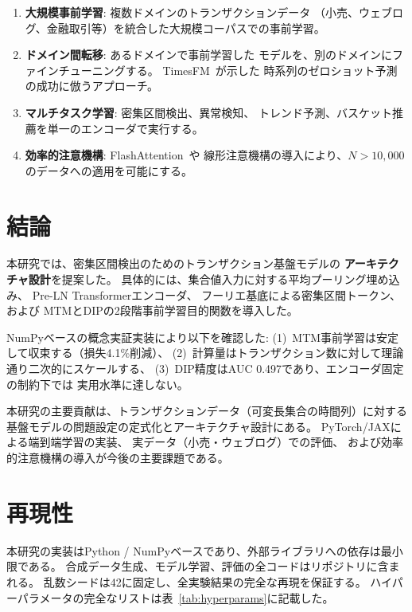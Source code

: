 \documentclass[sigconf,nonacm]{acmart}
\begin{document}
\begin{enumerate}
    \item \textbf{大規模事前学習}: 複数ドメインのトランザクションデータ
    （小売、ウェブログ、金融取引等）を統合した大規模コーパスでの事前学習。

    \item \textbf{ドメイン間転移}: あるドメインで事前学習した
    モデルを、別のドメインにファインチューニングする。
    TimesFM~\cite{das2024timesfm}が示した
    時系列のゼロショット予測の成功に倣うアプローチ。

    \item \textbf{マルチタスク学習}: 密集区間検出、異常検知、
    トレンド予測、バスケット推薦を単一のエンコーダで実行する。

    \item \textbf{効率的注意機構}: FlashAttention~\cite{dao2022flashattention}や
    線形注意機構の導入により、$N > 10{,}000$のデータへの適用を可能にする。
\end{enumerate}

\section{結論}
\label{sec:conclusion}

本研究では、密集区間検出のためのトランザクション基盤モデルの
\textbf{アーキテクチャ設計}を提案した。
具体的には、集合値入力に対する平均プーリング埋め込み、
Pre-LN Transformerエンコーダ、
フーリエ基底による密集区間トークン、および
MTMとDIPの2段階事前学習目的関数を導入した。

NumPyベースの概念実証実装により以下を確認した:
(1)~MTM事前学習は安定して収束する（損失4.1\%削減）、
(2)~計算量はトランザクション数に対して理論通り二次的にスケールする、
(3)~DIP精度はAUC 0.497であり、エンコーダ固定の制約下では
実用水準に達しない。

本研究の主要貢献は、トランザクションデータ（可変長集合の時間列）に対する
基盤モデルの問題設定の定式化とアーキテクチャ設計にある。
PyTorch/JAXによる端到端学習の実装、
実データ（小売・ウェブログ）での評価、
および効率的注意機構の導入が今後の主要課題である。

\section*{再現性}

本研究の実装はPython / NumPyベースであり、外部ライブラリへの依存は最小限である。
合成データ生成、モデル学習、評価の全コードはリポジトリに含まれる。
乱数シードは42に固定し、全実験結果の完全な再現を保証する。
ハイパーパラメータの完全なリストは表~\ref{tab:hyperparams}に記載した。



\end{document}
